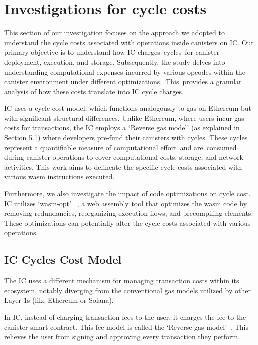 \chapter{Investigations for cycle costs}
\label{chap:chapterfive}

This section of our investigation focuses on the approach we adopted to understand the cycle costs associated with operations inside canisters on IC. Our primary objective is to understand how IC charges cycles for canister deployment, execution, and storage. Subsequently, the study delves into understanding computational expenses incurred by various opcodes within the canister environment under different optimizations. This provides a granular analysis of how these costs translate into IC cycle charges.

IC uses a cycle cost model, which functions analogously to gas on Ethereum but with significant structural differences. Unlike Ethereum, where users incur gas costs for transactions, the IC employs a ‘Reverse gas model’ (as explained in Section 5.1) where developers pre-fund their canisters with cycles. These cycles represent a quantifiable measure of computational effort and are consumed during canister operations to cover computational costs, storage, and network activities. This work aims to delineate the specific cycle costs associated with various wasm instructions executed.

Furthermore, we also investigate the impact of code optimizations on cycle cost. IC utilizes ‘wasm-opt’ ~\cite{WebAssemblyBinaryen}, a web assembly tool that optimizes the wasm code by removing redundancies, reorganizing execution flows, and precompiling elements. These optimizations can potentially alter the cycle costs associated with various operations.









\section{IC Cycles Cost Model}

The IC uses a different mechanism for managing transaction costs within its ecosystem, notably diverging from the conventional gas models utilized by other Layer 1s (like Ethereum or Solana).

In IC, instead of charging transaction fees to the user, it charges the fee to the canister smart contract. This fee model is called the ‘Reverse gas model’~\cite{ICPReverseGas}. This relieves the user from signing and approving every transaction they perform.    

